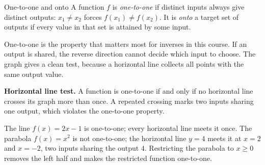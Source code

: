 \documentclass[12pt]{book}
\begin{document}
\begin{definition}{One-to-one and onto}
A function $f$ is \emph{one-to-one} if distinct inputs always give distinct outputs:
$x_1\neq x_2$ forces $f(x_1)\neq f(x_2)$. It is \emph{onto} a target set of outputs
if every value in that set is attained by some input.
\end{definition}

One-to-one is the property that matters most for inverses in this course. If an output is
shared, the reverse direction cannot decide which input to choose. The graph gives a
clean test, because a horizontal line collects all points with the same output value.

\begin{keyidea}
\textbf{Horizontal line test.} A function is one-to-one if and only if no horizontal
line crosses its graph more than once. A repeated crossing marks two inputs sharing
one output, which violates the one-to-one property.
\end{keyidea}

\begin{center}
\end{center}

\begin{example}
The line $f(x)=2x-1$ is one-to-one; every horizontal line meets it once. The parabola
$f(x)=x^2$ is not one-to-one; the horizontal line $y=4$ meets it at $x=2$ and
$x=-2$, two inputs sharing the output $4$. Restricting the parabola to $x\ge0$ removes
the left half and makes the restricted function one-to-one.
\end{example}
\end{document}
